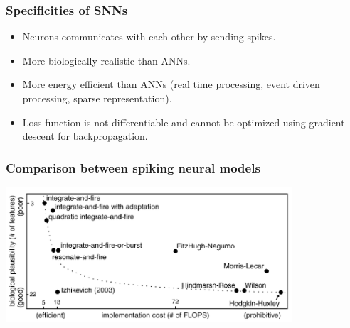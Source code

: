 \documentclass[aspectratio=169, 11pt]{beamer}
\begin{document}
\begin{frame}
  \frametitle{Specificities of SNNs}
  \begin{itemize}
    \item Neurons communicates with each other by sending spikes.
    \item More biologically realistic than ANNs.
    \item More energy efficient than ANNs (real time processing, event driven processing, sparse representation).
    \item Loss function is not differentiable and cannot be optimized using gradient descent for backpropagation.
  \end{itemize}
\end{frame}

\begin{frame}
  \frametitle{Comparison between spiking neural models}
  \begin{center}
    \includegraphics[width=0.8\textwidth]{image/theo1.png}
  \end{center}
\end{frame}
\end{document}
